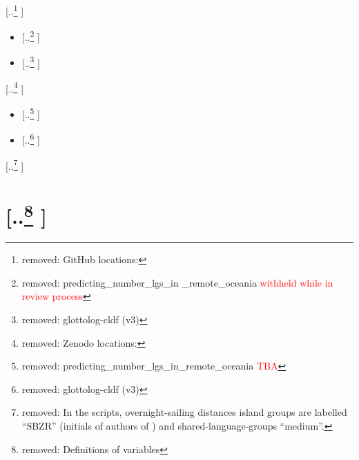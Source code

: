 \documentclass[unnumsec,webpdf,modern,medium]{oup-authoring-template}
\providecommand{\DIFdeltex}[1]{{\protect\color{red} [..\footnote{removed: #1} ]}} %
\providecommand{\DIFdelbegin}{} %
\providecommand{\DIFdel}[1]{\texorpdfstring{\DIFdeltex{#1}}{}} %
\newcommand{\DIFscaledelfig}{0.5}
\newlength{\DIFdelgraphicswidth} %
\newlength{\DIFdelgraphicsheight} %
\newcommand{\DIFdelincludegraphics}[2][]{%
\sbox{\DIFdelgraphicsbox}{\DIFOincludegraphics[#1]{#2}}%
\settoboxwidth{\DIFdelgraphicswidth}{\DIFdelgraphicsbox} %
\settoboxtotalheight{\DIFdelgraphicsheight}{\DIFdelgraphicsbox} %
\scalebox{\DIFscaledelfig}{%
\parbox[b]{\DIFdelgraphicswidth}{\usebox{\DIFdelgraphicsbox}\\[-\baselineskip] \rule{\DIFdelgraphicswidth}{0em}}\llap{\resizebox{\DIFdelgraphicswidth}{\DIFdelgraphicsheight}{%
\setlength{\unitlength}{\DIFdelgraphicswidth}%
\begin{picture}(1,1)%
\thicklines\linethickness{2pt} %
{\color[rgb]{1,0,0}\put(0,0){\framebox(1,1){}}}%
{\color[rgb]{1,0,0}\put(0,0){\line( 1,1){1}}}%
{\color[rgb]{1,0,0}\put(0,1){\line(1,-1){1}}}%
\end{picture}%
}\hspace*{3pt}}} %
} %
\DeclareRobustCommand{\DIFdelbegin}{\DIFOdelbegin \let\includegraphics\DIFdelincludegraphics} %
\begin{document}
\DIFdelbegin \DIFdel{GitHub locations:
}%
\begin{itemize}%
\item%
\DIFdel{predicting\_number\_lgs\_in \_remote\_oceania  \textcolor{red}{withheld while in review process}
}%
\item%
\DIFdel{glottolog-cldf (v3) }%

\end{itemize}%

\DIFdel{Zenodo locations:
}%
\begin{itemize}%
\item%
\DIFdel{predicting\_number\_lgs\_in\_remote\_oceania  \textcolor{red}{TBA}
}%
\item%
\DIFdel{glottolog-cldf (v3) }%

\end{itemize}%

\DIFdel{In the scripts, overnight-sailing distances island groups are labelled ``SBZR'' (initials of authors of \cite{NZSA_overnight_2023}) and shared-language-groups ``medium''.
}%

\section{\DIFdel{Definitions of variables}}
\addtocounter{section}{-1}%
\end{document}
